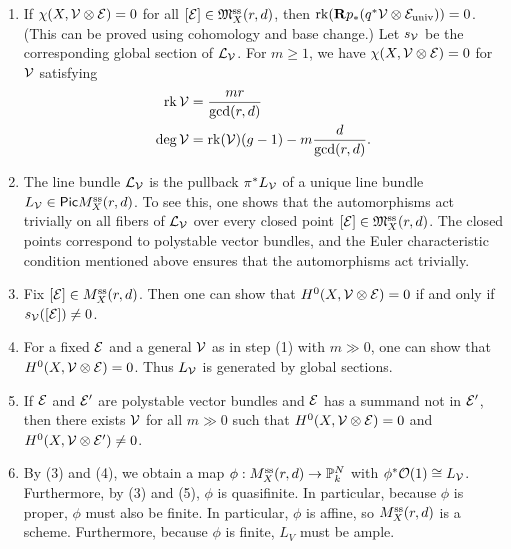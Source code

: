 \documentclass{amsart}
\begin{document}
\begin{enumerate}
	\item If $\chi(X, \mathcal{V} \otimes \mathcal{E}) = 0$ for all $[\mathcal{E}] \in \mathfrak{M}_X^{\mathrm{ss}}(r, d)$, then $\operatorname{rk} (\mathbf{R} p_* (q^* \mathcal{V} \otimes \mathcal{E}_{\mathrm{univ}})) = 0$.
		(This can be proved using cohomology and base change.)
		Let $s_{\mathcal{V}}$ be the corresponding global section of $\mathcal{L}_{\mathcal{V}}$.
		For $m \geq 1$, we have $\chi(X, \mathcal{V} \otimes \mathcal{E}) = 0$ for $\mathcal{V}$ satisfying
		\begin{align*}
			\operatorname{rk} \mathcal{V} &= \frac{m r}{\gcd(r, d)} \\
			\deg \mathcal{V} &= \operatorname{rk}(\mathcal{V}) (g - 1) - m \frac{d}{\gcd(r, d)}.
		\end{align*}
	\item The line bundle $\mathcal{L}_{\mathcal{V}}$ is the pullback $\pi^* L_{\mathcal{V}}$ of a unique line bundle $L_{\mathcal{V}} \in \mathsf{Pic} M_X^{\mathrm{ss}}(r, d)$.
		To see this, one shows that the automorphisms act trivially on all fibers of $\mathcal{L}_{\mathcal{V}}$ over every closed point $[\mathcal{E}] \in \mathfrak{M}_X^{\mathrm{ss}}(r, d)$.
		The closed points correspond to polystable vector bundles, and the Euler characteristic condition mentioned above ensures that the automorphisms act trivially.
	\item Fix $[\mathcal{E}] \in M_X^{\mathrm{ss}}(r, d)$.
		Then one can show that $H^0(X, \mathcal{V} \otimes \mathcal{E}) = 0$ if and only if $s_{\mathcal{V}}([\mathcal{E}]) \neq 0$.
	\item For a fixed $\mathcal{E}$ and a general $\mathcal{V}$ as in step (1) with $m \gg 0$, one can show that $H^0(X, \mathcal{V} \otimes \mathcal{E}) = 0$.
		Thus $L_{\mathcal{V}}$ is generated by global sections.
	\item If $\mathcal{E}$ and $\mathcal{E}'$ are polystable vector bundles and $\mathcal{E}$ has a summand not in $\mathcal{E}'$, then there exists $\mathcal{V}$ for all $m \gg 0$ such that $H^0(X, \mathcal{V} \otimes \mathcal{E}) = 0$ and $H^0(X, \mathcal{V} \otimes \mathcal{E}') \neq 0$.
	\item By (3) and (4), we obtain a map $\phi: M_X^{\mathrm{ss}}(r, d) \to \mathbb{P}_k^N$ with $\phi^* \mathcal{O}(1) \cong L_{\mathcal{V}}$.
		Furthermore, by (3) and (5), $\phi$ is quasifinite.
		In particular, because $\phi$ is proper, $\phi$ must also be finite.
		In particular, $\phi$ is affine, so $M_X^{\mathrm{ss}}(r, d)$ is a scheme.
		Furthermore, because $\phi$ is finite, $L_V$ must be ample.
\end{enumerate}
\end{document}

